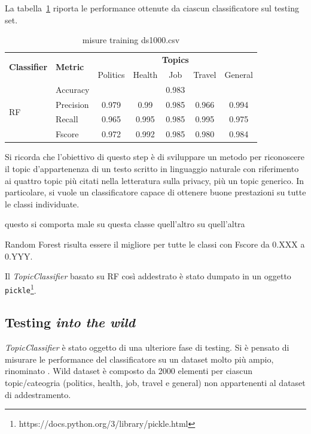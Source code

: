 La tabella~\ref{tbl:training_ds1000} riporta le performance ottenute da ciascun classificatore sul testing set.
\begin{table}[h]
\begin{tabular}{|l|l|c|c|c|c|c|}
\hline
\multirow{2}{*}{\textbf{Classifier}} & \multirow{2}{*}{\textbf{Metric}} & \multicolumn{5}{c|}{\textbf{Topics}} \\ \cline{3-7} 
 &  & Politics & Health & Job & Travel & General \\ \hline
\multirow{4}{*}{RF} & Accuracy & \multicolumn{5}{c|}{0.983} \\ \cline{2-7} 
 & Precision & 0.979 & 0.99 & 0.985 & 0.966 & 0.994 \\ \cline{2-7} 
 & Recall & 0.965 & 0.995 & 0.985  & 0.995 & 0.975 \\ \cline{2-7} 
 & Fscore & 0.972 & 0.992 & 0.985 & 0.980 & 0.984 \\ \hline
\end{tabular}
\caption{misure training ds1000.csv}
\label{tbl:training_ds1000}
\end{table}
\FloatBarrier
Si ricorda che l'obiettivo di questo step è di sviluppare un metodo per riconoscere il topic d'appartenenza di un testo scritto in linguaggio naturale con riferimento ai quattro topic più citati nella letteratura sulla privacy, più un topic generico. In particolare, si vuole un classificatore capace di ottenere buone prestazioni su tutte le classi individuate. 

questo si comporta male su questa classe
quell'altro su quell'altra

Random Forest risulta essere il migliore per tutte le classi con Fscore da 0.XXX a 0.YYY.


Il \textit{TopicClassifier} basato su RF così addestrato è stato dumpato in un oggetto {\tt pickle}\footnote{https://docs.python.org/3/library/pickle.html}.

\subsection{Testing \textit{into the wild}}
\label{ssec:testing_wild}
\textit{TopicClassifier} è stato oggetto di una ulteriore fase di testing. Si è pensato di misurare le performance del classificatore su un dataset molto più ampio, rinominato . Wild dataset è composto da 2000 elementi per ciascun topic/cateogria (politics, health, job, travel e general) non appartenenti al dataset di addestramento.

